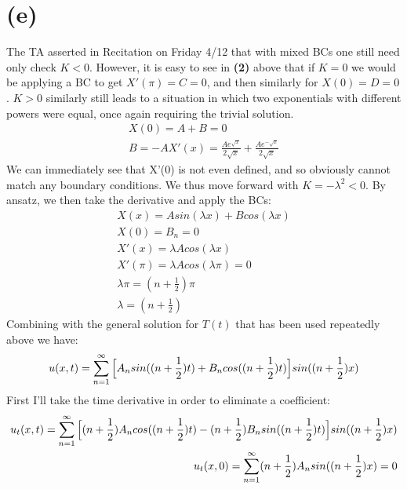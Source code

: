 \documentclass{article}
\begin{document}
\section*{\textbf{(e)}}
The TA asserted in Recitation on Friday 4/12 that with mixed BCs one still need only check $K<0$. However, it is easy to see in \textbf{(2)} above that if $K=0$ we would be applying a BC to get $X'(\pi) = C = 0$, and then similarly for $X(0) = D = 0$. $K>0$ similarly still leads to a situation in which two exponentials with different powers were equal, once again requiring the trivial solution.
\begin{equation}
\begin{aligned}
X(0) = A + B = 0\\
B = - A
X'(x) = \frac{Ae^{\sqrt{x}}}{2\sqrt{x}} + \frac{Ae^{-\sqrt{x}}}{2\sqrt{x}}
\end{aligned}
\end{equation}
We can immediately see that X'(0) is not even defined, and so obviously cannot match any boundary conditions. We thus move forward with $K = -\lambda^2 < 0$. By ansatz, we then take the derivative and apply the BCs:
\begin{equation}
\begin{aligned}
X(x) = Asin(\lambda x) + Bcos(\lambda x)\\
X(0) = B_n = 0\\
X'(x) = \lambda Acos(\lambda x)\\
X'(\pi) = \lambda Acos(\lambda\pi) = 0\\
\lambda\pi = (n+\frac{1}{2})\pi\\
\lambda = (n+\frac{1}{2})
\end{aligned}
\end{equation}
Combining with the general solution for $T(t)$ that has been used repeatedly above we have:
\begin{equation}
\begin{aligned}
u(x,t) = \sum^{\infty}_{n=1}\Big{[}A_nsin((n+\frac{1}{2})t) + B_ncos((n+\frac{1}{2})t)\Big{]}sin((n+\frac{1}{2})x)
\end{aligned}
\end{equation}
First I'll take the time derivative in order to eliminate a coefficient:
\begin{equation}
\begin{aligned}
u_t(x,t) = \sum^{\infty}_{n=1}\Big{[}(n+\frac{1}{2})A_ncos((n+\frac{1}{2})t) - (n+\frac{1}{2})B_nsin((n+\frac{1}{2})t)\Big{]}sin((n+\frac{1}{2})x)\\
u_t(x,0) = \sum_{n=1}^{\infty}(n+\frac{1}{2})A_nsin((n+\frac{1}{2})x) = 0
\end{aligned}
\end{equation}
\end{document}
